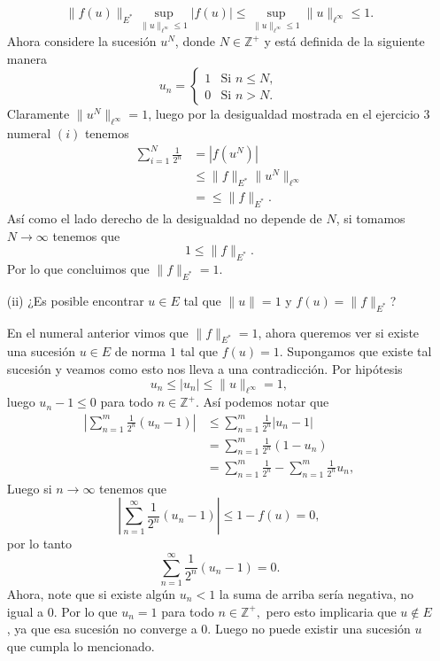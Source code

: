 \begin{enumerate}
\begin{sols}
    $$\|f(u)\|_{E^*}\sup_{\|u\|_{\ell^\infty}\leq 1}|f(u)|\leq\sup_{\|u\|_{\ell^\infty}\leq 1}\|u\|_{\ell^\infty}\leq 1.$$
    Ahora considere la sucesión $u^N$, donde $N\in \mathbb{Z}^+$ y está definida de la siguiente manera
    $$u_n=\begin{cases}
        1 & \text{Si }n\leq N,\\
        0 & \text{Si }n>N.
    \end{cases}$$
    Claramente $\|u^N\|_{\ell^\infty}=1$, luego por la desigualdad mostrada en el ejercicio $3$ numeral $(i)$ tenemos
    \begin{align*}
        \sum_{i=1}^N\frac{1}{2^n}&=|f(u^N)|\\
        &\leq\|f\|_{E^*}\|u^N\|_{\ell^\infty}\\
        &=\leq\|f\|_{E^*}
    .\end{align*}
    Así como el lado derecho de la desigualdad no depende de $N$, si tomamos $N\to \infty$ tenemos que 
    $$1\leq\|f\|_{E^*}.$$
    Por lo que concluimos que $\|f\|_{E^*}=1.$
    
    \end{sols}
    \item[(ii)] ¿Es posible encontrar $u \in E$ tal que $\|u\| = 1$ y $f(u) = \|f\|_{E^*}$?
    \begin{sols}
        En el numeral anterior vimos que $\|f\|_{E^*}=1$, ahora queremos ver si existe una sucesión $u\in E$ de norma $1$ tal que $f(u)=1.$ Supongamos que existe tal sucesión y veamos como esto nos lleva a una contradicción. Por hipótesis
        $$u_n\leq |u_n|\leq \|u\|_{\ell^\infty}=1,$$
        luego $u_n-1\leq 0$ para todo $n\in \mathbb{Z}^+.$ Así podemos notar que
        \begin{align*}
        \left|\sum_{n=1}^m\frac{1}{2^n}(u_n-1)\right|&\leq \sum_{n=1}^m\frac{1}{2^n}|u_n-1|\\
        &=\sum_{n=1}^m\frac{1}{2^n}(1-u_n)\\
        &=\sum_{n=1}^m\frac{1}{2^n}-\sum_{n=1}^m\frac{1}{2^n}u_n,
        \end{align*}
        Luego si $n\to \infty$ tenemos que 
        $$\left|\sum_{n=1}^\infty\frac{1}{2^n}(u_n-1)\right|\leq 1-f(u)=0,$$
        por lo tanto  
        $$\sum_{n=1}^\infty\frac{1}{2^n}(u_n-1)=0.$$
        Ahora, note que si existe algún $u_n<1$ la suma de arriba sería negativa, no igual a 0. Por lo que $u_n=1$ para todo $n\in \mathbb{Z}^+,$ pero esto implicaria que $u\notin E$, ya que esa sucesión no converge a 0. Luego no puede existir una sucesión $u$ que cumpla lo mencionado.

    \end{sols}
\end{enumerate}




